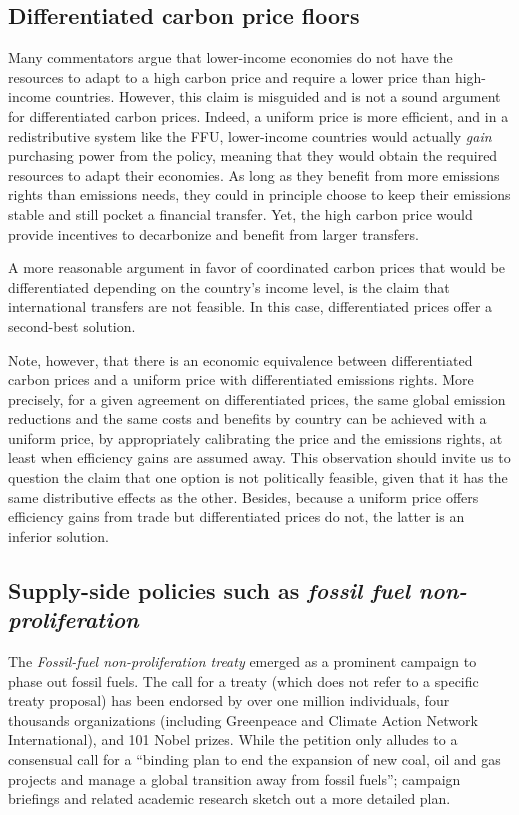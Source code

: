 \documentclass[12pt,english]{article}
\begin{document}
\subsection{Differentiated carbon price floors}

Many commentators argue that lower-income economies do not have the resources to adapt to a high carbon price and require a lower price than high-income countries. However, this claim is misguided and is not a sound argument for differentiated carbon prices.\citep{aldy_promise_2012} Indeed, a uniform price is more efficient, and in a redistributive system like the FFU, lower-income countries would actually \textit{gain} purchasing power from the policy, meaning that they would obtain the required resources to adapt their economies. As long as they benefit from more emissions rights than emissions needs, they could in principle choose to keep their emissions stable and still pocket a financial transfer. Yet, the high carbon price would provide incentives to decarbonize and benefit from larger transfers. 

A more reasonable argument in favor of coordinated carbon prices that would be differentiated depending on the country's income level,\citep{parry_proposal_2021} is the claim that international transfers are not feasible. In this case, differentiated prices offer a second-best solution. 

Note, however, that there is an economic equivalence between differentiated carbon prices and a uniform price with differentiated emissions rights. More precisely, for a given agreement on differentiated prices, the same global emission reductions and the same costs and benefits by country can be achieved with a uniform price, by appropriately calibrating the price and the emissions rights, at least when efficiency gains are assumed away. This observation should invite us to question the claim that one option is not politically feasible, given that it has the same distributive effects as the other. Besides, because a uniform price offers efficiency gains from trade but differentiated prices do not, the latter is an inferior solution.

\subsection{Supply-side policies such as \textit{fossil fuel non-proliferation}}

The \textit{Fossil-fuel non-proliferation treaty} emerged as a prominent campaign to phase out fossil fuels. The call for a treaty (which does not refer to a specific treaty proposal) has been endorsed by over one million individuals, four thousands organizations (including Greenpeace and Climate Action Network International), and 101 Nobel prizes. While the petition only alludes to a consensual call for a ``binding plan to end the expansion of new coal, oil and gas projects and manage a global transition away from fossil fuels''; campaign briefings and related academic research sketch out a more detailed plan.\citep{civil_society_equity_review_fair_2021,civil_society_equity_review_equitable_2023,calverley_phaseout_2022,fossil_fuel_non-proliferation_treaty_global_2023}
\end{document}
